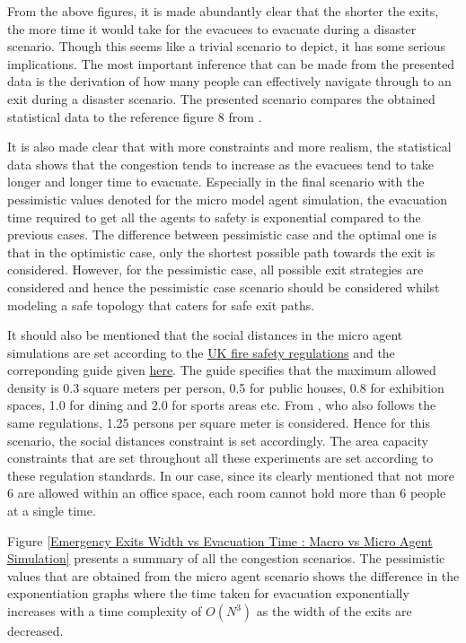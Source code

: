 From the above figures, it is made abundantly clear that the shorter the exits, the more time it would take for the evacuees to evacuate during a disaster scenario. Though this seems like a trivial scenario to depict, it has some serious implications. The most important inference that can be made from the presented data is the derivation of how many people can effectively navigate through to an exit during a disaster scenario. The presented scenario compares the obtained statistical data to the reference figure 8 from \cite{ref5}.

It is also made clear that with more constraints and more realism, the statistical data shows that the congestion tends to increase as the evacuees tend to take longer and longer time to evacuate. Especially in the final scenario with the pessimistic values denoted for the micro model agent simulation, the evacuation time required to get all the agents to safety is exponential compared to the previous cases. The difference between pessimistic case and the optimal one is that in the optimistic case, only the shortest possible path towards the exit is considered. However, for the pessimistic case, all possible exit strategies are considered and hence the pessimistic case scenario should be considered whilst modeling a safe topology that caters for safe exit paths.

It should also be mentioned that the social distances in the micro agent simulations are set according to the \href{https://www.gov.uk/workplace-fire-safety-your-responsibilities}{UK fire safety regulations} and the correponding guide given \href{https://www.merseyfire.gov.uk/aspx/pages/protection/pdf/Calculating_Occupancy_assembly_buildings_GT.pdf}{here}. The guide specifies that the maximum allowed density is 0.3 square meters per person, 0.5 for public houses, 0.8 for exhibition spaces, 1.0 for dining and 2.0 for sports areas etc. From \cite{ref5}, who also follows the same regulations, 1.25 persons per square meter is considered. Hence for this scenario, the social distances constraint is set accordingly. The area capacity constraints that are set throughout all these experiments are set according to these regulation standards. In our case, since its clearly mentioned that not more 6 are allowed within an office space, each room cannot hold more than 6 people at a single time.

Figure \ref{Emergency Exits Width vs Evacuation Time : Macro vs Micro Agent Simulation} presents a summary of all the congestion scenarios. The pessimistic values that are obtained from the micro agent scenario shows the difference in the exponentiation graphs where the time taken for evacuation exponentially increases with a time complexity of $O(N^3)$ as the width of the exits are decreased.  

